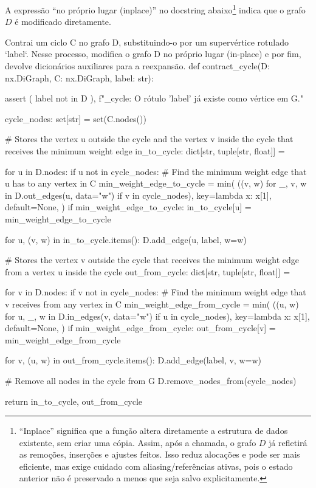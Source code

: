 \documentclass[12pt,a4paper]{article}
\begin{document}
\noindent A expressão “no próprio lugar (in\-place)” no docstring abaixo\footnote{“In\-place” significa que a função altera diretamente a estrutura de dados existente, sem criar uma cópia. Assim, após a chamada, o grafo \(D\) já refletirá as remoções, inserções e ajustes feitos. Isso reduz alocações e pode ser mais eficiente, mas exige cuidado com aliasing/referências ativas, pois o estado anterior não é preservado a menos que seja salvo explicitamente.} indica que o grafo \(D\) é modificado diretamente.

\begin{pybox}[title={Contração de ciclo},colback=blue!5!white,colframe=blue!75!black]{Contrai um ciclo C no grafo D, substituindo-o por um supervértice rotulado `label`. Nesse processo, modifica o grafo D no próprio lugar (in-place) e por fim, devolve dicionários auxiliares para a reexpansão.}
def contract_cycle(D: nx.DiGraph, C: nx.DiGraph, label: str):
    
    assert (
            label not in D
        ), f"\ncontract_cycle: O rótulo '{label}' já existe como vértice em G."

    cycle_nodes: set[str] = set(C.nodes())

    # Stores the vertex u outside the cycle and the vertex v inside the cycle that receives the minimum weight edge
    in_to_cycle: dict[str, tuple[str, float]] = {}

    for u in D.nodes:
        if u not in cycle_nodes:
            # Find the minimum weight edge that u has to any vertex in C
            min_weight_edge_to_cycle = min(
                ((v, w) for _, v, w in D.out_edges(u, data="w") if v in cycle_nodes),
                key=lambda x: x[1],
                default=None,
            )
            if min_weight_edge_to_cycle:
                in_to_cycle[u] = min_weight_edge_to_cycle

    for u, (v, w) in in_to_cycle.items():
        D.add_edge(u, label, w=w)

    # Stores the vertex v outside the cycle that receives the minimum weight edge from a vertex u inside the cycle
    out_from_cycle: dict[str, tuple[str, float]] = {}

    for v in D.nodes:
        if v not in cycle_nodes:
            # Find the minimum weight edge that v receives from any vertex in C
            min_weight_edge_from_cycle = min(
                ((u, w) for u, _, w in D.in_edges(v, data="w") if u in cycle_nodes),
                key=lambda x: x[1],
                default=None,
            )
            if min_weight_edge_from_cycle:
                out_from_cycle[v] = min_weight_edge_from_cycle

    for v, (u, w) in out_from_cycle.items():
        D.add_edge(label, v, w=w)

    # Remove all nodes in the cycle from G
    D.remove_nodes_from(cycle_nodes)

    return in_to_cycle, out_from_cycle
\end{pybox}
\end{document}
